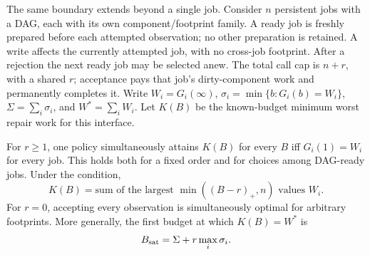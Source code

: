 The same boundary extends beyond a single job. Consider $n$ persistent jobs with a DAG, each with its own component/footprint family. A ready job is freshly prepared before each attempted observation; no other preparation is retained. A write affects the currently attempted job, with no cross-job footprint. After a rejection the next ready job may be selected anew. The total call cap is $n+r$, with a shared $r$; acceptance pays that job's dirty-component work and permanently completes it. Write $W_i=G_i(\infty)$, $\sigma_i=\min\{b:G_i(b)=W_i\}$, $\Sigma=\sum_i\sigma_i$, and $W^*=\sum_iW_i$. Let $K(B)$ be the known-budget minimum worst repair work for this interface.

\begin{theorem}
\label{thm:repairdag}
For $r\ge1$, one policy simultaneously attains $K(B)$ for every $B$ iff $G_i(1)=W_i$ for every job. This holds both for a fixed order and for choices among DAG-ready jobs. Under the condition,
\[
K(B)=\text{sum of the largest }\min((B-r)_+,n)\text{ values }W_i.
\]
For $r=0$, accepting every observation is simultaneously optimal for arbitrary footprints. More generally, the first budget at which $K(B)=W^*$ is
\[
B_{\rm sat}=\Sigma+r\max_i\sigma_i.
\]
\end{theorem}
